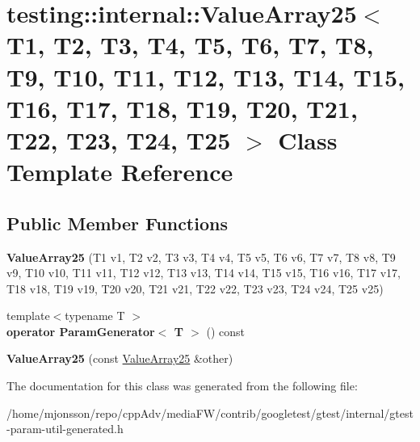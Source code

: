 \hypertarget{classtesting_1_1internal_1_1ValueArray25}{}\section{testing\+:\+:internal\+:\+:Value\+Array25$<$ T1, T2, T3, T4, T5, T6, T7, T8, T9, T10, T11, T12, T13, T14, T15, T16, T17, T18, T19, T20, T21, T22, T23, T24, T25 $>$ Class Template Reference}
\label{classtesting_1_1internal_1_1ValueArray25}
\subsection*{Public Member Functions}
\begin{DoxyCompactItemize}
\item 
\mbox{\label{classtesting_1_1internal_1_1ValueArray25_a8e4f816b4e038c6851fb66066430b226}} 
{\bfseries Value\+Array25} (T1 v1, T2 v2, T3 v3, T4 v4, T5 v5, T6 v6, T7 v7, T8 v8, T9 v9, T10 v10, T11 v11, T12 v12, T13 v13, T14 v14, T15 v15, T16 v16, T17 v17, T18 v18, T19 v19, T20 v20, T21 v21, T22 v22, T23 v23, T24 v24, T25 v25)
\item 
\mbox{\label{classtesting_1_1internal_1_1ValueArray25_ad861f628c2490518a2f2cc18fd709607}} 
{\footnotesize template$<$typename T $>$ }\\{\bfseries operator Param\+Generator$<$ T $>$} () const
\item 
\mbox{\label{classtesting_1_1internal_1_1ValueArray25_a38557aeef2acf50afd6fa6f10f33a99c}} 
{\bfseries Value\+Array25} (const \hyperlink{classtesting_1_1internal_1_1ValueArray25}{Value\+Array25} \&other)
\end{DoxyCompactItemize}


The documentation for this class was generated from the following file\+:\begin{DoxyCompactItemize}
\item 
/home/mjonsson/repo/cpp\+Adv/media\+F\+W/contrib/googletest/gtest/internal/gtest-\/param-\/util-\/generated.\+h\end{DoxyCompactItemize}
